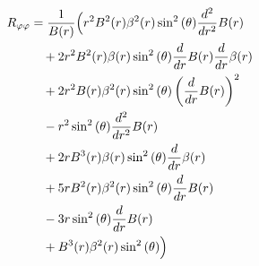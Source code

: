 \documentclass[11pt,a4paper]{article}
\begin{document}
\begin{align*}
  R_{\varphi\varphi} &= \frac{1}{B{\left(r \right)}}\Bigl(r^{2} B^{2}{\left(r \right)} \beta^{2}{\left(r \right)} \sin^{2}{\left(\theta \right)} \frac{d^{2}}{d r^{2}} B{\left(r \right)} \\
  &\quad + 2 r^{2} B^{2}{\left(r \right)} \beta{\left(r \right)} \sin^{2}{\left(\theta \right)} \frac{d}{d r} B{\left(r \right)} \frac{d}{d r} \beta{\left(r \right)} \\
  &\quad + 2 r^{2} B{\left(r \right)} \beta^{2}{\left(r \right)} \sin^{2}{\left(\theta \right)} \left(\frac{d}{d r} B{\left(r \right)}\right)^{2} \\
  &\quad - r^{2} \sin^{2}{\left(\theta \right)} \frac{d^{2}}{d r^{2}} B{\left(r \right)} \\
  &\quad + 2 r B^{3}{\left(r \right)} \beta{\left(r \right)} \sin^{2}{\left(\theta \right)} \frac{d}{d r} \beta{\left(r \right)} \\
  &\quad + 5 r B^{2}{\left(r \right)} \beta^{2}{\left(r \right)} \sin^{2}{\left(\theta \right)} \frac{d}{d r} B{\left(r \right)} \\
  &\quad - 3 r \sin^{2}{\left(\theta \right)} \frac{d}{d r} B{\left(r \right)} \\
  &\quad + B^{3}{\left(r \right)} \beta^{2}{\left(r \right)} \sin^{2}{\left(\theta \right)}\Bigr)
\end{align*}
\end{document}
